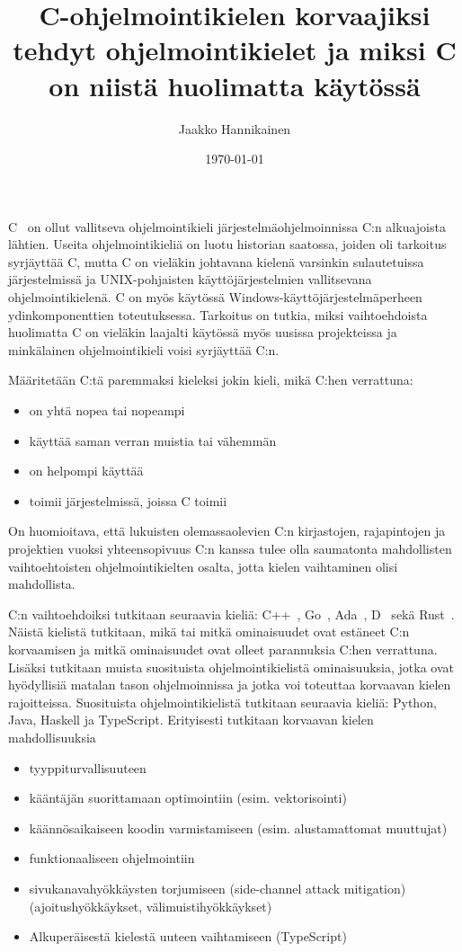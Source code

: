 \documentclass{article}
\title{C-ohjelmointikielen korvaajiksi tehdyt ohjelmointikielet ja miksi C on
niistä huolimatta käytössä}
\author{Jaakko Hannikainen}
\date{\today}
\begin{document}
\maketitle

C~\citep{C11} on ollut vallitseva ohjelmointikieli järjestelmäohjelmoinnissa C:n
alkuajoista lähtien. Useita ohjelmointikieliä on luotu historian saatossa,
joiden oli tarkoitus syrjäyttää C, mutta C on vieläkin johtavana kielenä
varsinkin sulautetuissa järjestelmissä ja UNIX-pohjaisten käyttöjärjestelmien
vallitsevana ohjelmointikielenä. C on myös käytössä
Windows-käyttöjärjestelmäperheen ydinkomponenttien toteutuksessa. Tarkoitus on
tutkia, miksi vaihtoehdoista huolimatta C on vieläkin laajalti käytössä myös
uusissa projekteissa ja minkälainen ohjelmointikieli voisi syrjäyttää C:n.

Määritetään C:tä paremmaksi kieleksi jokin kieli, mikä C:hen verrattuna:

\begin{itemize}
    \item on yhtä nopea tai nopeampi
    \item käyttää saman verran muistia tai vähemmän
    \item on helpompi käyttää
    \item toimii järjestelmissä, joissa C toimii
\end{itemize}

On huomioitava, että lukuisten olemassaolevien C:n kirjastojen, rajapintojen ja
projektien vuoksi yhteensopivuus C:n kanssa tulee olla saumatonta mahdollisten
vaihtoehtoisten ohjelmointikielten osalta, jotta kielen vaihtaminen olisi
mahdollista.

C:n vaihtoehdoiksi tutkitaan seuraavia kieliä: C++~\citep{CPP14},
Go~\citep{golang}, Ada~\citep{ADA12}, D~\citep{D} sekä Rust~\citep{rust}.
Näistä kielistä tutkitaan, mikä tai mitkä ominaisuudet ovat estäneet C:n
korvaamisen ja mitkä ominaisuudet ovat olleet parannuksia C:hen verrattuna.
Lisäksi tutkitaan muista suosituista ohjelmointikielistä ominaisuuksia, jotka
ovat hyödyllisiä matalan tason ohjelmoinnissa ja jotka voi toteuttaa korvaavan
kielen rajoitteissa. Suosituista ohjelmointikielistä tutkitaan seuraavia
kieliä: Python, Java, Haskell ja TypeScript. Erityisesti tutkitaan korvaavan
kielen mahdollisuuksia

\begin{itemize}
    \item tyyppiturvallisuuteen
    \item kääntäjän suorittamaan optimointiin
        (esim. vektorisointi)
    \item käännösaikaiseen koodin varmistamiseen
        (esim. alustamattomat muuttujat)
    \item funktionaaliseen ohjelmointiin
    \item sivukanavahyökkäysten torjumiseen (side-channel attack mitigation)
        (ajoitushyökkäykset, välimuistihyökkäykset)
    \item Alkuperäisestä kielestä uuteen vaihtamiseen (TypeScript)
\end{itemize}
\end{document}
